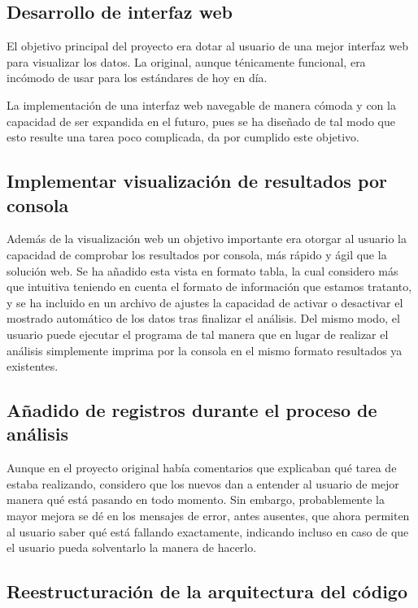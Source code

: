 \documentclass[a4paper, 12pt]{book}
\begin{document}
\subsection{Desarrollo de interfaz web}

El objetivo principal del proyecto era dotar al usuario de una mejor interfaz web para visualizar los datos. La original, aunque ténicamente funcional, era incómodo de usar para los estándares de hoy en día.

La implementación de una interfaz web navegable de manera cómoda y con la capacidad de ser expandida en el futuro, pues se ha diseñado de tal modo que esto resulte una tarea poco complicada, da por cumplido este objetivo.

\subsection{Implementar visualización de resultados por consola}

Además de la visualización web un objetivo importante era otorgar al usuario la capacidad de comprobar los resultados por consola, más rápido y ágil que la solución web. Se ha añadido esta vista en formato tabla, la cual considero más que intuitiva teniendo en cuenta el formato de información que estamos tratanto, y se ha incluido en un archivo de ajustes la capacidad de activar o desactivar el mostrado automático de los datos tras finalizar el análisis. Del mismo modo, el usuario puede ejecutar el programa de tal manera que en lugar de realizar el análisis simplemente imprima por la consola en el mismo formato resultados ya existentes. 

\subsection{Añadido de registros durante el proceso de análisis}

Aunque en el proyecto original había comentarios que explicaban qué tarea de estaba realizando, considero que los nuevos dan a entender al usuario de mejor manera qué está pasando en todo momento. Sin embargo, probablemente la mayor mejora se dé en los mensajes de error, antes ausentes, que ahora permiten al usuario saber qué está fallando exactamente, indicando incluso en caso de que el usuario pueda solventarlo la manera de hacerlo.

\subsection{Reestructuración de la arquitectura del código}
\end{document}
